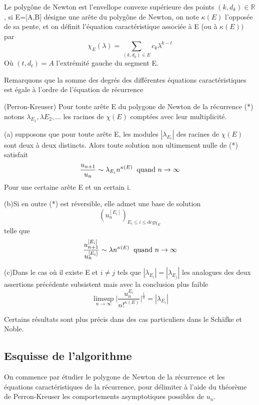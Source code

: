 \documentclass[a4paper,10.5pt]{article}
\begin{document}
	
	\begin{definition} Le polygône de Newton est l'envellope convexe supérieure des points $(k, d_{k}) \in \mathbb{R}$, si E=[A,B] désigne une arête du polygône de Newton, on note $\kappa(E)$ l'opposée de sa pente, et on définit l'équation caractéristique associée à E (ou à $\kappa(E))$ par
		\[\chi_{E}(\lambda)=\sum_{(k,d_{k}) \in E} c_{k}\lambda^{k-t}\]
		Où $(t,d_{t})=A$ l'extrémité gauche du segment E.
	\end{definition}
	
	Remarquons que la somme des degrés des différentes équations caractéristiques est égale à l'ordre de l'équation de récurrence 
	
	\begin{theorem} (Perron-Kreuser)
		Pour toute arête E du polygone de Newton de la récurrence (*) notons $\lambda_{E_{1}},\lambda{E_{2}},...$ les racines de $\chi(E)$ comptées avec leur multiplicité.
		
		(a) supposons que pour toute arête E, les modules $|\lambda_{E_{i}}|$ des racines de $\chi(E)$ sont deux à deux distincts. Alors toute solution non ultimement nulle de (*) satisfait
		\[\frac{u_{n+1}}{u_{n}}\sim \lambda_{E_{i}}n^{\kappa(E)} \hspace{2mm} \text{quand } n \rightarrow \infty\]
		Pour une certaine arête E et un certain i.
		
		(b)Si en outre (*) est réversible, elle admet une base de solution 
		\[(u_{n}^{[E_{i}]})_{E_{i}\leq i \leq deg \chi_{E}}\]
		telle que 
		\[\frac{u_{n+1}^{[E_{i}]}}{u_{n}^{[E_{i}]}}\sim \lambda n^{\kappa(E)} \hspace{2mm} \text{quand } n \rightarrow \infty\]
		
		(c)Dans le cas où il existe E et $i \neq j$ tels que $|\lambda_{E_{i}}|=|\lambda_{E_{j}}|$ les analogues des deux assertions précédente subsistent mais avec la conclusion plus faible
		\[\limsup_{n \rightarrow \infty } \big|\frac{u_{n}^{E_{i}}}{n!^{\kappa(E)}}\big|^{\frac{1}{n}}=|\lambda_{E_{i}}|\]
	\end{theorem}
	
	Certains résultats sont plus précis dans des cas particuliers dans le Schäfke et Noble.
	
	\subsection{Esquisse de l'algorithme}
	
	On commence par étudier le polygone de Newton de la récurrence et les équations caractéristiques de la récurrence, pour délimiter à l'aide du théorème de Perron-Kreuser les comportements asymptotiques possibles de $u_{n}$.
	
\end{document}
